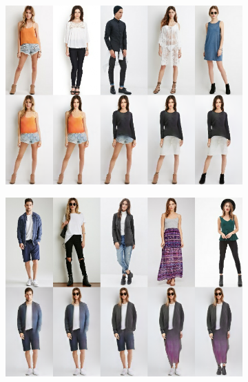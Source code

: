 \begin{figure}[b!]
\begin{subfigure}{.43\linewidth}
	\label{fig:part3_30}
	\end{subfigure}
	\vspace*{-1.em}
	\centering
	\begin{subfigure}{.43\linewidth}
	\centering
	\includegraphics[trim={0cm 0cm 0cm 0cm},clip, width=1.\linewidth]{fig/supp/DeepF/2}
	\label{fig:part3_30}
	\end{subfigure}\hspace{0.03\textwidth}
	\label{fig:partswaps2}
	\centering
	\begin{subfigure}{.43\linewidth}
	\centering
	\includegraphics[trim={0cm 0cm 0cm 0cm},clip, width=1.\linewidth]{fig/supp/DeepF/4}
	\label{fig:part3_21}
	\end{subfigure}

\end{figure}
